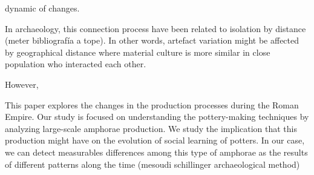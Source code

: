 \documentclass[review]{elsarticle}
\begin{document}
dynamic of changes. 










In archaeology, this connection process have been related to isolation by distance (meter bibliografía a tope). In other words, artefact variation might be affected by geographical distance where material culture is more similar in close population who interacted each other. 


                                


However, 


This paper explores the changes in the production processes during the Roman Empire. Our study is focused on understanding the pottery-making techniques by analyzing large-scale amphorae production. We study the implication that this production might have on the evolution of social learning of potters. In our case, we can detect measurables differences among this type of amphorae as the results of different patterns along the time (mesoudi schillinger archaeological method)
\end{document}
